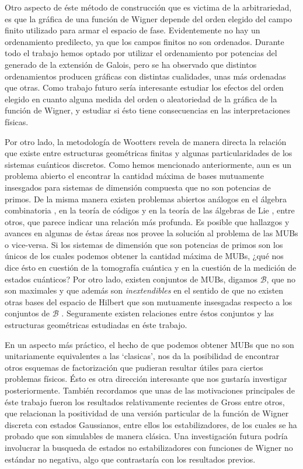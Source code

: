 \documentclass[a4paper,11pt]{report}
\begin{document}
  Otro aspecto de éste método de construcción que es victima
  de la arbitrariedad, es que la gráfica de una función de
  Wigner depende del orden elegido del campo finito
  utilizado para armar el espacio de fase. Evidentemente no
  hay un ordenamiento predilecto, ya que los campos finitos
  no son ordenados.  Durante todo el trabajo hemos optado
  por utilizar el ordenamiento por potencias del generado de
  la extensión de Galois, pero se ha observado que distintos
  ordenamientos producen gráficas con distintas cualidades,
  unas más ordenadas que otras. Como trabajo futuro sería
  interesante estudiar los efectos del orden elegido en
  cuanto alguna medida del orden o aleatoriedad de la
  gráfica de la función de Wigner, y estudiar si ésto tiene
  consecuencias en las interpretaciones físicas.

  Por otro lado, la metodología de Wootters revela de manera
  directa la relación que existe entre estructuras
  geométricas finitas y algunas particularidades de los
  sistemas cuánticos discretos. Como hemos mencionado
  anteriormente, aun es un problema abierto el encontrar la
  cantidad máxima de bases mutuamente insesgados para
  sistemas de dimensión compuesta que no son potencias de
  primos. De la misma manera existen problemas abiertos
  análogos en el álgebra combinatoria \cite{kantor2003}, en
  la teoría de códigos \cite{kantor1982} y en la teoría de
  las álgebras de Lie \cite{ivanov1987, kantor1996,
  boykin2005}, entre otros, que parece indicar una relación
  más profunda. Es posible que hallazgos y avances en
  algunas de éstas áreas nos provee la solución al problema
  de las MUBs o vice-versa. Si los sistemas de dimensión que
  son potencias de primos son los únicos de los cuales
  podemos obtener la cantidad máxima de MUBs, ¿qué nos dice
  ésto en cuestión de la tomografía cuántica y en la
  cuestión de la medición de estados cuánticos? Por otro
  lado, existen conjuntos de MUBs, digamos $\mathcal B$, que
  no son maximales y que además son \textit{inextendibles}
  en el sentido de que no existen otras bases del espacio de
  Hilbert que son mutuamente insesgadas respecto a los
  conjuntos de $\mathcal B$ \cite{garcia2021}. Seguramente
  existen relaciones entre éstos conjuntos y las estructuras
  geométricas estudiadas en éste trabajo. 

  En un aspecto más práctico, el hecho de que podemos
  obtener MUBs que no son unitariamente equivalentes a las
  `clasicas', nos da la posibilidad de encontrar otros
  esquemas de factorización que pudieran resultar útiles
  para ciertos problemas físicos. Ésto es otra dirección
  interesante que nos gustaría investigar posteriormente.
  También recordamos que unas de las motivaciones
  principales de éste trabajo fueron los resultados
  relativamente recientes de Gross \cite{gross2006} entre
  otros, que relacionan la positividad de una versión
  particular de la función de Wigner discreta con estados
  Gaussianos, entre ellos los estabilizadores, de los cuales
  se ha probado que son simulables de manera clásica. Una
  investigación futura podría involucrar la busqueda de
  estados no estabilizadores con funciones de Wigner no
  estándar no negativa, algo que contrastaría con los
  resultados previos.

  \newpage
  \appendix
  

  \newpage
  \printbibliography
\end{document}
